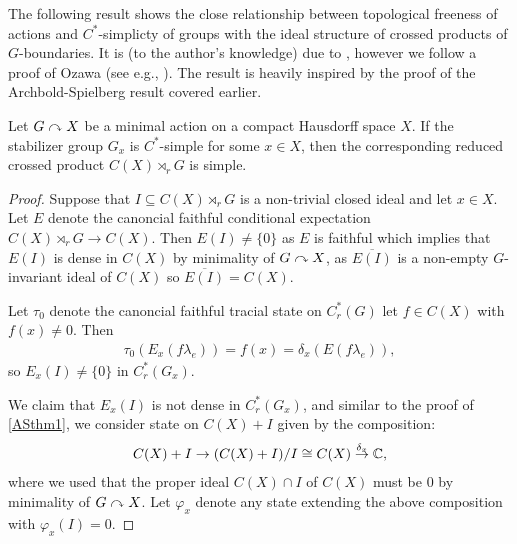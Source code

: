 The following result shows the close relationship between topological freeness of actions and $C^*$-simplicty of groups with the ideal structure of crossed products of $G$-boundaries. It is (to the author's knowledge) due to \cite{breuillard2017c}, however we follow a proof of Ozawa (see e.g., \cite{ozawa2014lecture}). The result is heavily inspired by the proof of the Archbold-Spielberg result covered earlier.
\begin{proposition}
	Let $G \stackrel{}{\curvearrowright} X$ be a minimal action on a compact Hausdorff space $X$. If the stabilizer group $G_x$ is $C^*$-simple for some $x \in X$, then the corresponding reduced crossed product $C(X) \rtimes_{r} G$ is simple.
	\label{ozawa15pt1}
\end{proposition}
\begin{proof}
	Suppose that $I \subseteq C(X) \rtimes_r G$ is a non-trivial closed ideal and let $x \in X$. Let $E$ denote the canoncial faithful conditional expectation $C(X) \rtimes_r G \to C(X)$. Then $E(I) \neq \{0\}$ as $E$ is faithful which implies that $E(I)$ is dense in $C(X)$ by minimality of $G \stackrel{}{\curvearrowright}X$, as $\overline{E(I)}$ is a non-empty $G$-invariant ideal of $C(X)$ so $\overline{E(I)} = C(X)$.

Let $\tau_0$ denote the canoncial faithful tracial state on $C_r^*(G)$ let $f \in C(X)$ with $f(x) \neq 0$. Then 
\begin{align*}
	\tau_0 (E_x(f \lambda_e))= f(x) = \delta_x(E(f\lambda_e)),
\end{align*}
so $E_x(I) \neq \{0\}$ in $C_r^*(G_x)$. 

We claim that $E_x(I)$ is not dense in $C_r^*(G_x)$, and similar to the proof of \cref{ASthm1}, we consider state on $C(X) + I$ given by the composition:
	\begin{align*}
		C(X) + I \to (C(X)+I)/I \cong C(X) \stackrel {\delta_x} \to \mathbb{C},
	\end{align*}
	where we used that the proper ideal $C(X) \cap I$ of $C(X)$ must be $0$ by minimality of $G \stackrel{}{\curvearrowright} X$. Let $\varphi_x$ denote any state extending the above composition with $\varphi_x(I) =0$.
	

\end{proof}
